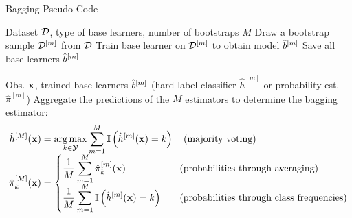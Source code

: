 \documentclass[11pt,compress,t,notes=noshow, xcolor=table]{beamer}
\begin{document}
\begin{vbframe}{Bagging Pseudo Code}
\vspace{-2ex}
\begin{algorithm}[H]
  \scriptsize
  \caption*{Bagging algorithm: Training}
  \begin{algorithmic}[1]
     Dataset $\mathcal{D}$, type of base learners, number of bootstraps $M$
      \State Draw a bootstrap sample $\mathcal{D}^{[m]}$ from $\mathcal{D}$
      \State Train base learner on $\mathcal{D}^{[m]}$ to obtain model $\hat{b}^{[m]}$
    \EndFor
    \State Save all base learners $\hat{b}^{[m]}$
  \end{algorithmic}
\end{algorithm}
\vspace{-2ex}
\begin{algorithm}[H]
  \scriptsize
  \caption*{Bagging algorithm: Prediction in case of classification}
  \begin{algorithmic}[1]
     Obs. $\mathbf{x}$, trained base learners $\hat{b}^{[m]}$ (hard label classifier $\hat{h}^{[m]}$ or probability est. $\hat \pi^{[m]}$)
    \State Aggregate the predictions of the $M$ estimators to determine the bagging estimator:
    \vspace{-2ex}
    \begin{align*}
    \hat{h}^{[M]}(\mathbf{x}) &= \operatorname*{arg\,max}_{k \in \mathcal{Y}} \sum_{m=1}^M \mathbb{I}\left(\hat{h}^{[m]}(\mathbf{x}) = k\right) \quad \text{(majority voting)} \\[-1ex]
    \hat \pi_{k}^{[M]}(\mathbf{x}) &=
    \left\{
    \begin{aligned}
    &\frac{1}{M} \sum_{m=1}^M \hat \pi_{k}^{[m]}(\mathbf{x}) \quad && \text{(probabilities through averaging)} \\[-1ex]
    &\frac{1}{M} \sum_{m=1}^M \mathbb{I}\left(\hat{h}^{[m]}(\mathbf{x}) = k\right) \quad && \text{(probabilities through class frequencies)}
    \end{aligned}
    \right.
    \end{align*}
    \vspace{-3ex}
  \end{algorithmic}
\end{algorithm}
\vspace{-3ex}
\end{vbframe}
\end{document}
